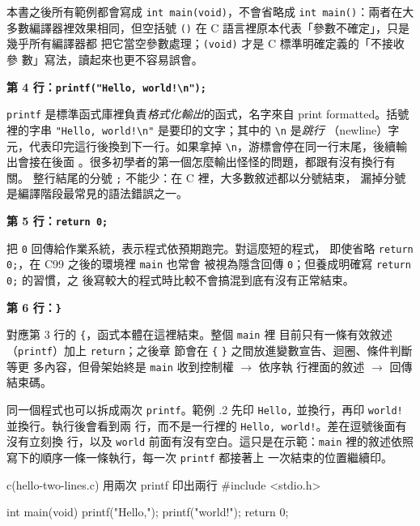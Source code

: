 本書之後所有範例都會寫成 \texttt{int main(void)}，不會省略成
\texttt{int main()}：兩者在大多數編譯器裡效果相同，但空括號
\texttt{()} 在 C 語言裡原本代表「參數不確定」，只是幾乎所有編譯器都
把它當空參數處理；\texttt{(void)} 才是 C 標準明確定義的「不接收參
數」寫法，讀起來也更不容易誤會。

\textbf{第 4 行：\texttt{printf("Hello, world!\textbackslash n");}}

\texttt{printf} 是標準函式庫裡負責\emph{格式化輸出}的函式，名字來自
print formatted。括號裡的字串 \texttt{"Hello, world!\textbackslash n"}
是要印的文字；其中的 \texttt{\textbackslash n} 是\emph{跳行}
（newline）字元，代表印完這行後換到下一行。如果拿掉
\texttt{\textbackslash n}，游標會停在同一行末尾，後續輸出會接在後面
。很多初學者的第一個怎麼輸出怪怪的問題，都跟有沒有換行有關。
整行結尾的分號 \texttt{;} 不能少：在 C 裡，大多數敘述都以分號結束，
漏掉分號是編譯階段最常見的語法錯誤之一。

\textbf{第 5 行：\texttt{return 0;}}

把 \texttt{0} 回傳給作業系統，表示程式依預期跑完。對這麼短的程式，
即使省略 \texttt{return 0;}，在 C99 之後的環境裡 \texttt{main} 也常會
被視為隱含回傳 \texttt{0}；但養成明確寫 \texttt{return 0;} 的習慣，之
後寫較大的程式時比較不會搞混到底有沒有正常結束。

\textbf{第 6 行：\texttt{\}}}

對應第 3 行的 \texttt{\{}，函式本體在這裡結束。整個 \texttt{main} 裡
目前只有一條有效敘述（\texttt{printf}）加上 \texttt{return}；之後章
節會在 \texttt{\{} \texttt{\}} 之間放進變數宣告、迴圈、條件判斷等更
多內容，但骨架始終是 \texttt{main} 收到控制權 $\rightarrow$ 依序執
行裡面的敘述 $\rightarrow$ 回傳結束碼。

同一個程式也可以拆成兩次 \texttt{printf}。範例 \thechapter.2 先印
\texttt{Hello,} 並換行，再印 \texttt{world!} 並換行。執行後會看到兩
行，而不是一行裡的 \texttt{Hello, world!}。差在逗號後面有沒有立刻換
行，以及 \texttt{world} 前面有沒有空白。這只是在示範：\texttt{main}
裡的敘述依照寫下的順序一條一條執行，每一次 \texttt{printf} 都接著上
一次結束的位置繼續印。

\begin{example}{c}{(hello-two-lines.c) 用兩次 printf 印出兩行}
#include <stdio.h>

int main(void) {
    printf("Hello,\n");
    printf("world!\n");
    return 0;
}
\end{example}


